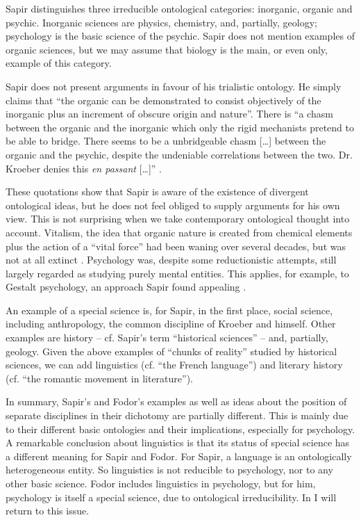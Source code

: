 \documentclass[output=paper]{langscibook}
\begin{document}
Sapir distinguishes three irreducible ontological categories: inorganic, organic and psychic. Inorganic sciences are physics, chemistry, and, partially, geology; psychology is the basic science of the psychic. Sapir does not mention examples of organic sciences, but we may assume that biology is the main, or even only, example of this category.

Sapir does not present arguments in favour of his trialistic ontology. He simply claims that ``the organic can be demonstrated to consist objectively of the inorganic plus an increment of obscure origin and nature''. There is ``a chasm between the organic and the inorganic which only the rigid mechanists pretend to be able to bridge. There seems to be a unbridgeable chasm […] between the organic and the psychic, despite the undeniable correlations between the two. Dr. Kroeber denies this \emph{en passant} […]'' \citep[444]{Sapir1917}.

These quotations show that Sapir is aware of the existence of divergent ontological ideas, but he does not feel obliged to supply arguments for his own view. This is not surprising when we take contemporary ontological thought into account. Vitalism, the idea that organic nature is created from chemical elements plus the action of a ``vital force'' had been waning over several decades, but was not at all extinct \citep[cf.][]{Beckner1967}. Psychology was, despite some reductionistic attempts, still largely regarded as studying purely mental entities. This applies, for example, to Gestalt psychology, an approach Sapir found appealing \citep[cf.][xvi]{Sapir1994}.

An example of a special science is, for Sapir, in the first place, social science, including anthropology, the common discipline of Kroeber and himself. Other examples are history -- cf. Sapir's term ``historical sciences'' -- and, partially, geology. Given the above examples of ``chunks of reality'' studied by historical sciences, we can add linguistics (cf. ``the French language'') and literary history (cf. ``the romantic movement in literature'').

In summary, Sapir's and Fodor's examples as well as ideas about the position of separate disciplines in their dichotomy are partially different. This is mainly due to their different basic ontologies and their implications, especially for psychology. A remarkable conclusion about linguistics is that its status of special science has a different meaning for Sapir and Fodor. For Sapir, a language is an ontologically heterogeneous entity. So linguistics is not reducible to psychology, nor to any other basic science. Fodor includes linguistics in psychology, but for him, psychology is itself a special science, due to ontological irreducibility. In  I will return to this issue.
\end{document}

